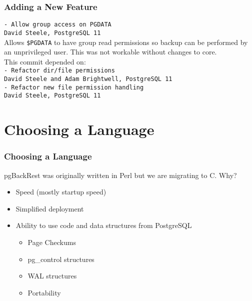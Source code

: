 \begin{frame}
    \frametitle{Adding a New Feature}

    \texttt{- Allow group access on PGDATA} \\
    \texttt{David Steele, PostgreSQL 11} \\
    \vspace{1em}
    Allows \texttt{\$PGDATA} to have group read permissions so backup can be performed by an unprivileged user.  This was not workable without changes to core. \\
    \vspace{1em}
    This commit depended on: \\
    \vspace{1em}
    \texttt{- Refactor dir/file permissions} \\
    \texttt{David Steele and Adam Brightwell, PostgreSQL 11} \\
    \vspace{1em}
    \texttt{- Refactor new file permission handling} \\
    \texttt{David Steele, PostgreSQL 11} \\
\end{frame}

\section{Choosing a Language}

\begin{frame}
    \frametitle{Choosing a Language}

    pgBackRest was originally written in Perl but we are migrating to C.  Why?\pause \\
    \vspace{1em}
    \begin{itemize}
        \item Speed (mostly startup speed)\pause
        \item Simplified deployment\pause
        \item Ability to use code and data structures from PostgreSQL\pause

        \begin{itemize}
            \item Page Checkums\pause
            \item pg\_control structures\pause
            \item WAL structures\pause
            \item Portability
        \end{itemize}
    \end{itemize}
\end{frame}

